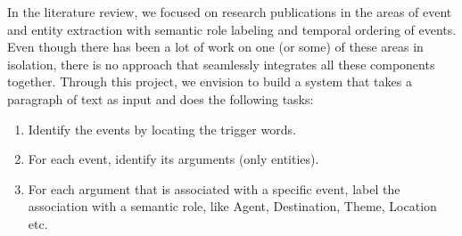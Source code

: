 In the literature review, we focused on research publications in the areas of event and entity extraction with semantic role labeling and temporal ordering of events. Even though there has been a lot of work on one (or some) of these areas in isolation, there is no approach that seamlessly integrates all these components together. Through this project, we envision to build a system that takes a paragraph of text as input and does the following tasks:

\begin{enumerate}
\item Identify the events by locating the trigger words.
\item For each event, identify its arguments (only entities).
\item For each argument that is associated with a specific event, label the association with a semantic role, like Agent, Destination, Theme, Location etc.
\end{enumerate}
